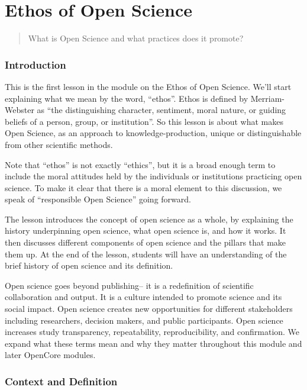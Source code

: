 \documentclass[
  letterpaper,
  DIV=11,
  numbers=noendperiod]{scrreport}
\begin{document}
\part{Ethos of Open Science}

\begin{quote}
What is Open Science and what practices does it promote?
\end{quote}

\hypertarget{introduction}{%
\section*{Introduction}\label{introduction}}


This is the first lesson in the module on the Ethos of Open Science.
We'll start explaining what we mean by the word, ``ethos''. Ethos is
defined by Merriam-Webster as ``the distinguishing character, sentiment,
moral nature, or guiding beliefs of a person, group, or institution''.
So this lesson is about what makes Open Science, as an approach to
knowledge-production, unique or distinguishable from other scientific
methods.

Note that ``ethos'' is not exactly ``ethics'', but it is a broad enough
term to include the moral attitudes held by the individuals or
institutions practicing open science. To make it clear that there is a
moral element to this discussion, we speak of ``responsible Open
Science'' going forward.

The lesson introduces the concept of open science as a whole, by
explaining the history underpinning open science, what open science is,
and how it works. It then discusses different components of open science
and the pillars that make them up. At the end of the lesson, students
will have an understanding of the brief history of open science and its
definition.

Open science goes beyond publishing-- it is a redefinition of scientific
collaboration and output. It is a culture intended to promote science
and its social impact. Open science creates new opportunities for
different stakeholders including researchers, decision makers, and
public participants. Open science increases study transparency,
repeatability, reproducibility, and confirmation. We expand what these
terms mean and why they matter throughout this module and later OpenCore
modules.

\hypertarget{context-and-definition}{%
\section*{Context and Definition}\label{context-and-definition}}
\end{document}
